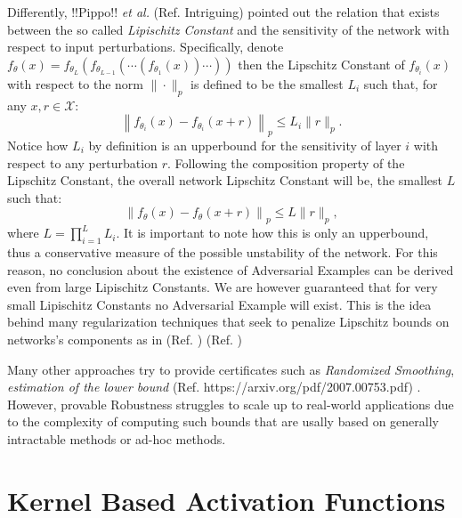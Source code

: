 \documentclass[LaM,binding=0.6cm]{./packages/sapthesis/sapthesis}
\begin{document}
            Differently, !!Pippo!! \textit{et al.} (Ref. Intriguing) pointed out the relation that exists 
            between the so called \textit{Lipischitz Constant} and the sensitivity of the network 
            with respect to input perturbations. Specifically, denote $f_{\theta}(x) = f_{\theta_L}(f_{\theta_{L-1}}(\cdots (f_{\theta_{1}}(x))\cdots)) $
            then the Lipschitz Constant of  $f_{\theta_i}(x)$ with respect to the norm $ \|\cdot\|_p $ is defined to be
            the smallest $L_i$ such that, for any $x, r \in \mathcal{X}$:
            \begin{equation}
                \label{LC}
                \left\|f_{\theta_i}\left(x \right)-f_{\theta_i}\left(x+r\right)\right\|_p \leq L_{i}\|r\|_p .
            \end{equation}
            Notice how $L_i$ by definition is an upperbound for the sensitivity of layer $i$ with respect
            to any perturbation $r$. Following the composition property of the
            Lipschitz Constant, the overall network Lipschitz Constant will be, the smallest $L$ such that:
            \begin{equation}
                \left\|f_{\theta}\left(x \right)-f_{\theta}\left(x+r\right)\right\|_p \leq L\|r\|_p,
            \end{equation}
            where $L=\prod_{i=1}^{L} L_{i}$. It is important to note how this is only an upperbound, thus a conservative
            measure of the possible unstability of the network. For this reason, no conclusion about the existence of 
            Adversarial Examples can be derived even from large Lipischitz Constants. We are however guaranteed 
            that for very small Lipischitz Constants no Adversarial Example will exist. This is the idea behind 
            many regularization techniques that seek to penalize Lipschitz bounds on networks's components as 
            in (Ref. ) (Ref. )

            Many other approaches try to provide certificates such as \textit{Randomized Smoothing}, \textit{estimation of the lower bound} (Ref. https://arxiv.org/pdf/2007.00753.pdf)
            . However, provable Robustness struggles to scale up to real-world applications
            due to the complexity of computing such bounds that are usally based on generally intractable methods or ad-hoc methods.





    \section{Kernel Based Activation Functions}
\end{document}
